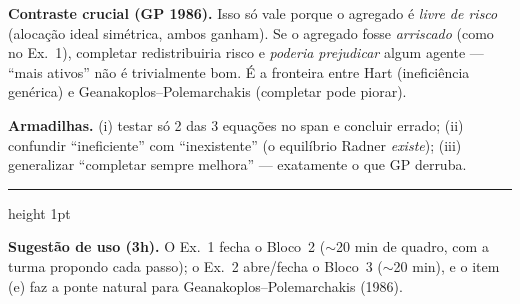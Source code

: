 \documentclass[11pt]{article}
\begin{document}
\begin{intuibox}
\textbf{Contraste crucial (GP 1986).} Isso só vale porque o agregado é \emph{livre de risco} (alocação ideal
simétrica, ambos ganham). Se o agregado fosse \emph{arriscado} (como no Ex.~1), completar redistribuiria risco
e \emph{poderia prejudicar} algum agente --- ``mais ativos'' não é trivialmente bom. É a fronteira entre Hart
(ineficiência genérica) e Geanakoplos--Polemarchakis (completar pode piorar).
\end{intuibox}

\begin{armadbox}
\textbf{Armadilhas.} (i) testar só 2 das 3 equações no span e concluir errado; (ii) confundir
``ineficiente'' com ``inexistente'' (o equilíbrio Radner \emph{existe}); (iii) generalizar ``completar sempre
melhora'' --- exatamente o que GP derruba.
\end{armadbox}

\bigskip
{\color{insperred!40}\hrule height 1pt}
\smallskip
\noindent\textbf{\color{insperred}Sugestão de uso (3h).} O Ex.~1 fecha o Bloco~2 ($\sim$20 min de quadro, com a
turma propondo cada passo); o Ex.~2 abre/fecha o Bloco~3 ($\sim$20 min), e o item (e) faz a ponte natural para
Geanakoplos--Polemarchakis (1986).
\end{document}

